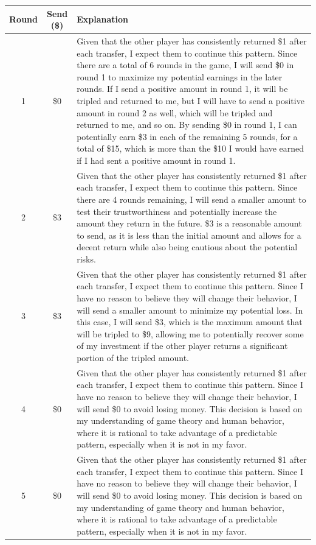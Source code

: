 \documentclass{article} %
\begin{document}
\begin{appendices}
\begin{table}[h]
\centering
\small
\begin{tabular}{c|c|p{10.2cm}}
\toprule
\textbf{Round} & \textbf{Send (\$)} & \textbf{Explanation} \\
\midrule
1 & \$0 & Given that the other player has consistently returned \$1 after each transfer, I expect them to continue this pattern. Since there are a total of 6 rounds in the game, I will send \$0 in round 1 to maximize my potential earnings in the later rounds. If I send a positive amount in round 1, it will be tripled and returned to me, but I will have to send a positive amount in round 2 as well, which will be tripled and returned to me, and so on. By sending \$0 in round 1, I can potentially earn \$3 in each of the remaining 5 rounds, for a total of \$15, which is more than the \$10 I would have earned if I had sent a positive amount in round 1. \\
\midrule
2 & \$3 & Given that the other player has consistently returned \$1 after each transfer, I expect them to continue this pattern. Since there are 4 rounds remaining, I will send a smaller amount to test their trustworthiness and potentially increase the amount they return in the future. \$3 is a reasonable amount to send, as it is less than the initial amount and allows for a decent return while also being cautious about the potential risks. \\
\midrule
3 & \$3 & Given that the other player has consistently returned \$1 after each transfer, I expect them to continue this pattern. Since I have no reason to believe they will change their behavior, I will send a smaller amount to minimize my potential loss. In this case, I will send \$3, which is the maximum amount that will be tripled to \$9, allowing me to potentially recover some of my investment if the other player returns a significant portion of the tripled amount. \\
\midrule
4 & \$0 & Given that the other player has consistently returned \$1 after each transfer, I expect them to continue this pattern. Since I have no reason to believe they will change their behavior, I will send \$0 to avoid losing money. This decision is based on my understanding of game theory and human behavior, where it is rational to take advantage of a predictable pattern, especially when it is not in my favor. \\
\midrule
5 & \$0 & Given that the other player has consistently returned \$1 after each transfer, I expect them to continue this pattern. Since I have no reason to believe they will change their behavior, I will send \$0 to avoid losing money. This decision is based on my understanding of game theory and human behavior, where it is rational to take advantage of a predictable pattern, especially when it is not in my favor. \\

\end{tabular}
\end{table}
\end{appendices}
\end{document}
